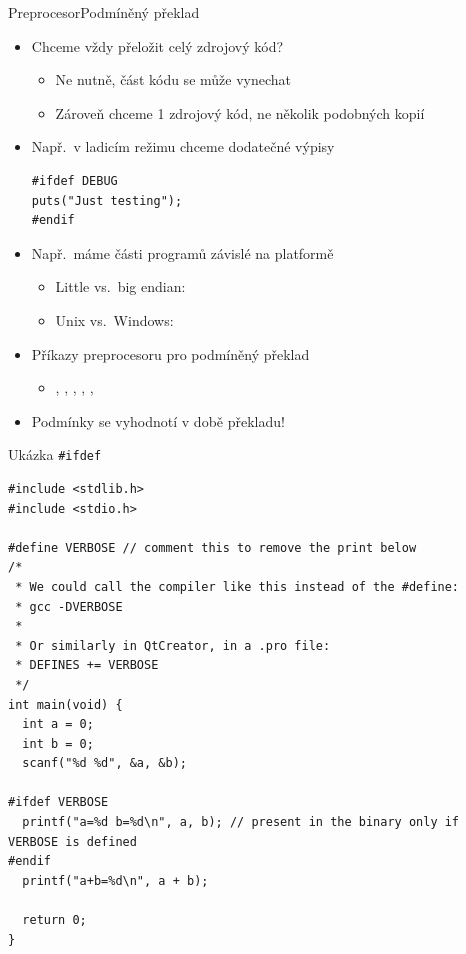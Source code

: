 \begin{frame}[fragile]{Preprocesor}{Podmíněný překlad}

  \begin{itemize}
    \item Chceme vždy přeložit celý zdrojový kód?
    \begin{itemize}
      \item Ne nutně, část kódu se může vynechat
      \item Zároveň chceme 1 zdrojový kód, ne několik podobných kopií
    \end{itemize}

    \pause

    \item Např.\ v ladicím režimu chceme dodatečné výpisy
\begin{lstlisting}
#ifdef DEBUG
puts("Just testing");
#endif
\end{lstlisting}

    \pause

    \item Např.\ máme části programů závislé na platformě
    \begin{itemize}
      \item Little vs.\ big endian:
      \item Unix vs.\ Windows: 
    \end{itemize}

    \pause

    \item Příkazy preprocesoru pro podmíněný překlad
    \begin{itemize}
      \item {}, , , ,
        , 
    \end{itemize}

    \pause

    \item Podmínky se vyhodnotí v době překladu!

  \end{itemize}

\end{frame}

\begin{frame}[fragile]{Ukázka \texttt{\#ifdef}}

\begin{lstlisting}
#include <stdlib.h>
#include <stdio.h>

#define VERBOSE // comment this to remove the print below
/*
 * We could call the compiler like this instead of the #define:
 * gcc -DVERBOSE
 *
 * Or similarly in QtCreator, in a .pro file:
 * DEFINES += VERBOSE
 */
int main(void) {
  int a = 0;
  int b = 0;
  scanf("%d %d", &a, &b);

#ifdef VERBOSE
  printf("a=%d b=%d\n", a, b); // present in the binary only if VERBOSE is defined
#endif
  printf("a+b=%d\n", a + b);

  return 0;
}
\end{lstlisting}

\end{frame}

